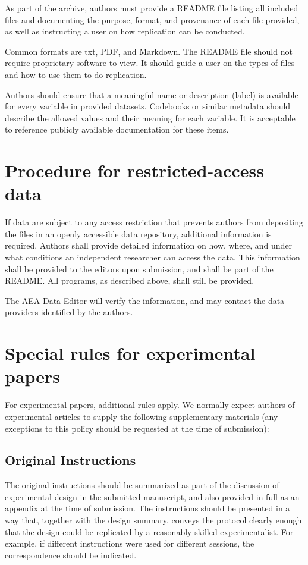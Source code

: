 \documentclass[PP]{AEA}
\begin{document}
As part of the archive, authors must provide a README file listing all included files and documenting the purpose, format, and provenance of each file provided, as well as instructing a user on how replication can be conducted.

Common formats are txt, PDF, and Markdown. The README file should not require proprietary software to view. It should guide a user on the types of files and how to use them to do replication.

Authors should ensure that a meaningful name or description (label) is available for every variable in provided datasets. Codebooks or similar metadata should describe the allowed values and their meaning for each variable. It is acceptable to reference publicly available documentation for these items.

\section{Procedure for restricted-access data}

If data are subject to any access restriction that prevents authors from depositing the files in an openly accessible data repository, additional information is required. Authors shall provide detailed information on how, where, and under what conditions an independent researcher can access the data. This information shall be provided to the editors upon submission, and shall be part of the README. All programs, as described above, shall still be provided.

The AEA Data Editor will verify the information, and may contact the data providers identified by the authors.

\section{Special rules for experimental papers}

For experimental papers, additional rules apply. We normally expect authors of experimental articles to supply the following  supplementary materials (any exceptions to this policy should be requested at the time of submission):

\subsection{Original Instructions}

The original instructions should be summarized as part of the discussion of experimental design in the submitted manuscript, and also provided in full as an appendix at the time of submission. The instructions should be presented in a way that, together with the design summary, conveys the protocol clearly enough that the design could be replicated by a reasonably skilled experimentalist. For example, if different instructions were used for different sessions, the correspondence should be indicated.
\end{document}
